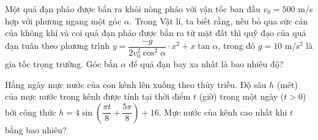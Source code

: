 \begin{bt}%

Một quả đạn pháo được bắn ra khỏi nòng pháo với vận tốc ban đầu $ v_0=500$ m/s hợp với phương ngang một góc $ \alpha $. Trong Vật lí, ta biết rằng, nếu bỏ qua sức cản của không khí và coi quả đạn pháo được bắn ra từ mặt đất thì quỹ đạo của quả đạn tuân theo phương trình $ y=\dfrac{-g}{2v_0^2\cos^2\alpha}\cdot x^2+x\tan \alpha $, trong đó $g = 10$ m/s$ ^2 $ là gia tốc trọng trường. Góc bắn $ \alpha $ để quả đạn bay xa nhất là bao nhiêu độ?
\end{bt}

\begin{bt}%

Hằng ngày mực nước của con kênh lên xuống theo thủy triều. Độ sâu $h$ (mét) của mực nước trong kênh được tính tại thời điểm $t$ (giờ) trong một ngày ($t > 0$) bởi công thức $h=4\sin (\dfrac{\pi t}{8}+\dfrac{5\pi}{8})+16$. Mực nước của kênh cao nhất khi $t$ bằng bao nhiêu?
\end{bt}

